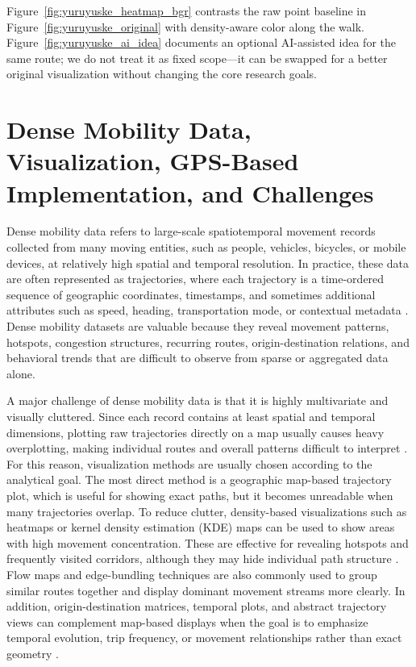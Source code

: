\documentclass[conference]{IEEEtran}
\begin{document}
Figure~\ref{fig:yuruyuske_heatmap_bgr} contrasts the raw point baseline in Figure~\ref{fig:yuruyuske_original} with density-aware color along the walk. Figure~\ref{fig:yuruyuske_ai_idea} documents an optional AI-assisted idea for the same route; we do not treat it as fixed scope---it can be swapped for a better original visualization without changing the core research goals.

\section{Dense Mobility Data, Visualization, GPS-Based Implementation, and Challenges}

Dense mobility data refers to large-scale spatiotemporal movement records collected from many moving entities, such as people, vehicles, bicycles, or mobile devices, at relatively high spatial and temporal resolution. In practice, these data are often represented as trajectories, where each trajectory is a time-ordered sequence of geographic coordinates, timestamps, and sometimes additional attributes such as speed, heading, transportation mode, or contextual metadata \cite{Zheng2015,Sobral2019}. Dense mobility datasets are valuable because they reveal movement patterns, hotspots, congestion structures, recurring routes, origin-destination relations, and behavioral trends that are difficult to observe from sparse or aggregated data alone.

A major challenge of dense mobility data is that it is highly multivariate and visually cluttered. Since each record contains at least spatial and temporal dimensions, plotting raw trajectories directly on a map usually causes heavy overplotting, making individual routes and overall patterns difficult to interpret \cite{Sobral2019,Fadloun2022}. For this reason, visualization methods are usually chosen according to the analytical goal. The most direct method is a geographic map-based trajectory plot, which is useful for showing exact paths, but it becomes unreadable when many trajectories overlap. To reduce clutter, density-based visualizations such as heatmaps or kernel density estimation (KDE) maps can be used to show areas with high movement concentration. These are effective for revealing hotspots and frequently visited corridors, although they may hide individual path structure \cite{Sobral2019,Feng2021}. Flow maps and edge-bundling techniques are also commonly used to group similar routes together and display dominant movement streams more clearly. In addition, origin-destination matrices, temporal plots, and abstract trajectory views can complement map-based displays when the goal is to emphasize temporal evolution, trip frequency, or movement relationships rather than exact geometry \cite{Fadloun2022}.
\end{document}
